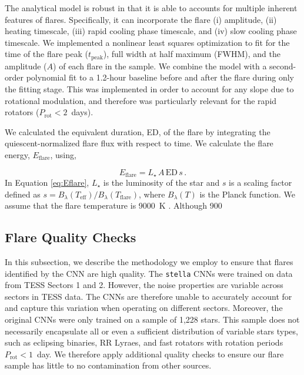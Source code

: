 \documentclass[twocolumn]{aastex631}
\begin{document}
The analytical model is robust in that it is able to accounts for multiple inherent features of flares. Specifically, it can incorporate the flare (i) amplitude, (ii) heating timescale, (iii) rapid cooling phase timescale, and (iv) slow cooling phase timescale. We implemented a nonlinear least squares optimization to fit for the time of the flare peak ($t_\textrm{peak}$), full width at half maximum (FWHM), and the amplitude ($A$) of each flare in the sample.  We combine the model with a second-order polynomial fit to a 1.2-hour baseline before and after the flare  during only the fitting stage. This was implemented in order to account for any slope due to rotational modulation, and therefore was particularly relevant for the rapid rotators ($P_\textrm{rot} < 2$~days).


We calculated the equivalent duration, ED, of the flare by integrating the quiescent-normalized flare flux with respect to time. We calculate the flare energy, $E_\textrm{flare}$, using,

\begin{equation}\label{eq:Eflare}
    E_\textrm{flare} = L_\star \, A \, \textrm{ED} \, s \, .
\end{equation}
In Equation \ref{eq:Eflare}, $L_\star$ is the luminosity of the star and $s$ is a scaling factor defined as $s = B_\lambda(T_\textrm{eff}) / B_\lambda(T_\textrm{flare})$, where $B_\lambda(T)$ is the Planck function. We assume that the flare temperature is 9000~K \citep{kretzschmar11}. Although 900

\subsection{Flare Quality Checks}\label{subsec2:qualitychecks}

In this subsection, we describe the methodology we employ to ensure that flares identified by the CNN are high quality. The \texttt{stella} CNNs were trained on data from TESS Sectors 1 and 2. However, the noise properties are variable across sectors in TESS data. The CNNs are therefore unable to accurately
account for and capture  this variation when operating on different sectors. Moreover, the original CNNs were only trained on a sample of 1,228 stars. This sample  does not necessarily encapsulate all or even a sufficient distribution  of variable stars types, such as eclipsing binaries, RR Lyraes, and fast rotators with rotation periods $P_\textrm{rot} < 1$~day. We therefore apply additional
quality checks to ensure our flare sample has little to no contamination from other sources.
\end{document}
